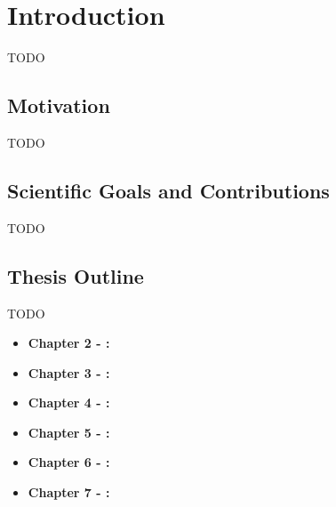 \chapter{Introduction} %
\label{chap:Chapter1}       %

TODO

\section{Motivation}
\label{sec:Chapter1-1} 

TODO

\section{Scientific Goals and Contributions}
\label{sec:Chapter1-2} 

TODO

\section{Thesis Outline}
\label{sec:Chapter1-3} 

    TODO
    \begin{itemize}
        \item \textbf{Chapter 2 - {\hypersetup{hidelinks}}:}
        \item \textbf{Chapter 3 - {\hypersetup{hidelinks}}:}
        \item \textbf{Chapter 4 - {\hypersetup{hidelinks}}:}                %
        \item \textbf{Chapter 5 - {\hypersetup{hidelinks}}:}       %
        \item \textbf{Chapter 6 - {\hypersetup{hidelinks}}:}
        \item \textbf{Chapter 7 - {\hypersetup{hidelinks}}:}
    \end{itemize}
